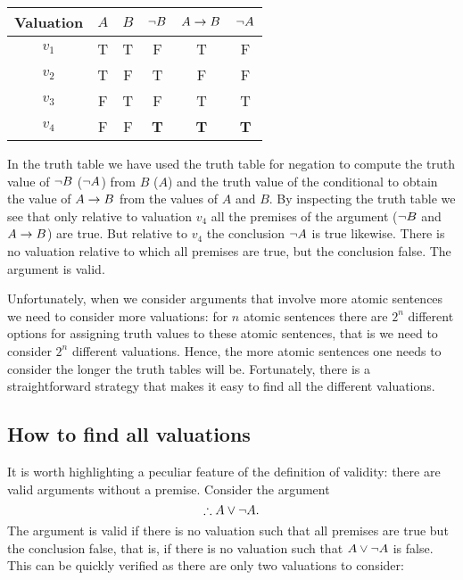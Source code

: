  \begin{center}
\begin{tabular}{c|cc|c|c||c}
Valuation&$A$&$B$&$\neg B$&$A\rightarrow B$&$\neg A$\\\hline
$v_1$&T & T & F & T & F\\
$v_2$&T & F & T & F & F\\
$v_3$&F & T & F & T & T\\
$v_4$&F & F & \textbf{T}& \textbf{T} & \textbf{T}
\end{tabular}
\end{center}

In the truth table we have used the truth table for negation to compute the truth value of $\neg B$ ($\neg A$) from $B$ ($A$) and the truth value of the conditional to obtain the value of $A\rightarrow B$ from the values of $A$ and $B$. By inspecting the truth table we see that only relative to valuation $v_4$ all the premises of the argument ($\neg B$ and $A\rightarrow B$) are true. But relative to $v_4$ the conclusion $\neg A$ is true likewise. There is no valuation relative to which all premises are true, but the conclusion false. The argument is valid.

Unfortunately, when we consider arguments that involve more atomic sentences we need to consider more valuations: for $n$ atomic sentences there are $2^n$ different options for assigning truth values to these atomic sentences, that is we need to consider $2^n$ different valuations. Hence, the more atomic sentences one needs to consider the longer the truth tables will be. Fortunately, there is a straightforward strategy that makes it easy to find all the different valuations.

\subsection{How to find all valuations}

It is worth highlighting a peculiar feature of the definition of validity: there are valid arguments without a premise. Consider the argument
$$\therefore A\eor\enot A.$$
The argument is valid if there is no valuation such that all premises are true but the conclusion false, that is, if there is no valuation such that $A\vee\neg A$ is false. This can be quickly verified as there are only two valuations to consider:

